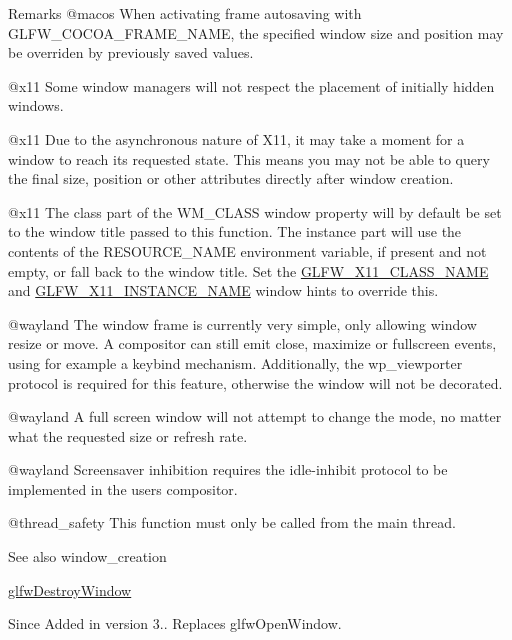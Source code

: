 \begin{DoxyRemark}{Remarks}
@macos When activating frame autosaving with G\+L\+F\+W\+\_\+\+C\+O\+C\+O\+A\+\_\+\+F\+R\+A\+M\+E\+\_\+\+N\+A\+ME, the specified window size and position may be overriden by previously saved values.

@x11 Some window managers will not respect the placement of initially hidden windows.

@x11 Due to the asynchronous nature of X11, it may take a moment for a window to reach its requested state. This means you may not be able to query the final size, position or other attributes directly after window creation.

@x11 The class part of the {\ttfamily W\+M\+\_\+\+C\+L\+A\+SS} window property will by default be set to the window title passed to this function. The instance part will use the contents of the {\ttfamily R\+E\+S\+O\+U\+R\+C\+E\+\_\+\+N\+A\+ME} environment variable, if present and not empty, or fall back to the window title. Set the \mbox{\hyperlink{group__window_gae5a9ea2fccccd92edbd343fc56461114}{G\+L\+F\+W\+\_\+\+X11\+\_\+\+C\+L\+A\+S\+S\+\_\+\+N\+A\+ME}} and \mbox{\hyperlink{group__window_ga494c3c0d911e4b860b946530a3e389e8}{G\+L\+F\+W\+\_\+\+X11\+\_\+\+I\+N\+S\+T\+A\+N\+C\+E\+\_\+\+N\+A\+ME}} window hints to override this.

@wayland The window frame is currently very simple, only allowing window resize or move. A compositor can still emit close, maximize or fullscreen events, using for example a keybind mechanism. Additionally, the wp\+\_\+viewporter protocol is required for this feature, otherwise the window will not be decorated.

@wayland A full screen window will not attempt to change the mode, no matter what the requested size or refresh rate.

@wayland Screensaver inhibition requires the idle-\/inhibit protocol to be implemented in the user\textquotesingle{}s compositor.
\end{DoxyRemark}
@thread\+\_\+safety This function must only be called from the main thread.

\begin{DoxySeeAlso}{See also}
window\+\_\+creation 

\mbox{\hyperlink{group__window_ga806747476b7247d292be3711c323ea10}{glfw\+Destroy\+Window}}
\end{DoxySeeAlso}
\begin{DoxySince}{Since}
Added in version 3.. Replaces {\ttfamily glfw\+Open\+Window}. 
\end{DoxySince}
\mbox{\label{group__window_ga8050ddceed9dc6bd9d3aa35666195cd4}} 
